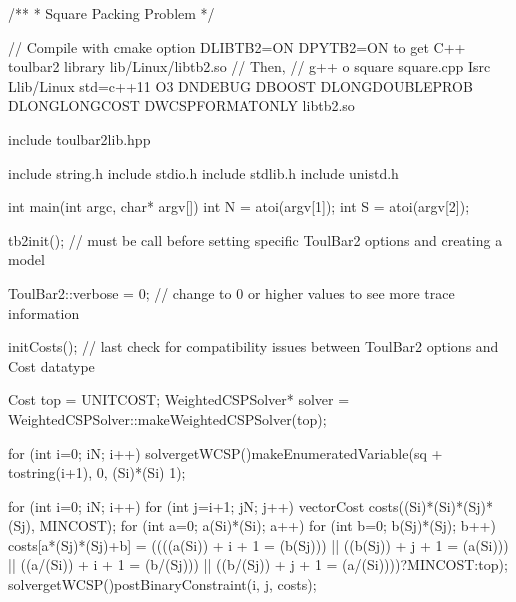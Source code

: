 \documentclass[letterpaper,10pt,openany,oneside,english]{sphinxmanual}
\begin{document}
\sphinxAtStartPar
{}

\begin{sphinxVerbatim}[commandchars=\\\{\}]

/**
 * Square Packing Problem
 */

// Compile with cmake option \PYGZhy{}DLIBTB2=ON \PYGZhy{}DPYTB2=ON to get C++ toulbar2 library lib/Linux/libtb2.so
// Then,
// g++ \PYGZhy{}o square square.cpp \PYGZhy{}Isrc \PYGZhy{}Llib/Linux \PYGZhy{}std=c++11 \PYGZhy{}O3 \PYGZhy{}DNDEBUG \PYGZhy{}DBOOST \PYGZhy{}DLONGDOUBLE\PYGZus{}PROB \PYGZhy{}DLONGLONG\PYGZus{}COST \PYGZhy{}DWCSPFORMATONLY libtb2.so

\PYGZsh{}include \PYGZdq{}toulbar2lib.hpp\PYGZdq{}

\PYGZsh{}include \PYGZlt{}string.h\PYGZgt{}
\PYGZsh{}include \PYGZlt{}stdio.h\PYGZgt{}
\PYGZsh{}include \PYGZlt{}stdlib.h\PYGZgt{}
\PYGZsh{}include \PYGZlt{}unistd.h\PYGZgt{}

int main(int argc, char* argv[])
\PYGZob{}
    int N = atoi(argv[1]);
    int S = atoi(argv[2]);

    tb2init(); // must be call before setting specific ToulBar2 options and creating a model

    ToulBar2::verbose = 0; // change to 0 or higher values to see more trace information

    initCosts(); // last check for compatibility issues between ToulBar2 options and Cost data\PYGZhy{}type

    Cost top = UNIT\PYGZus{}COST;
    WeightedCSPSolver* solver = WeightedCSPSolver::makeWeightedCSPSolver(top);

    for (int i=0; i\PYGZlt{}N; i++) \PYGZob{}
        solver\PYGZhy{}\PYGZgt{}getWCSP()\PYGZhy{}\PYGZgt{}makeEnumeratedVariable(\PYGZdq{}sq\PYGZdq{} + to\PYGZus{}string(i+1), 0, (S\PYGZhy{}i)*(S\PYGZhy{}i) \PYGZhy{} 1);
    \PYGZcb{}

    for (int i=0; i\PYGZlt{}N; i++) \PYGZob{}
        for (int j=i+1; j\PYGZlt{}N; j++) \PYGZob{}
            vector\PYGZlt{}Cost\PYGZgt{} costs((S\PYGZhy{}i)*(S\PYGZhy{}i)*(S\PYGZhy{}j)*(S\PYGZhy{}j), MIN\PYGZus{}COST);
    	    for (int a=0; a\PYGZlt{}(S\PYGZhy{}i)*(S\PYGZhy{}i); a++) \PYGZob{}
    	        for (int b=0; b\PYGZlt{}(S\PYGZhy{}j)*(S\PYGZhy{}j); b++) \PYGZob{}
                    costs[a*(S\PYGZhy{}j)*(S\PYGZhy{}j)+b] = ((((a\PYGZpc{}(S\PYGZhy{}i)) + i + 1 \PYGZlt{}= (b\PYGZpc{}(S\PYGZhy{}j))) || ((b\PYGZpc{}(S\PYGZhy{}j)) + j + 1 \PYGZlt{}= (a\PYGZpc{}(S\PYGZhy{}i))) || ((a/(S\PYGZhy{}i)) + i + 1 \PYGZlt{}= (b/(S\PYGZhy{}j))) || ((b/(S\PYGZhy{}j)) + j + 1 \PYGZlt{}= (a/(S\PYGZhy{}i))))?MIN\PYGZus{}COST:top);
                \PYGZcb{}
            \PYGZcb{}
            solver\PYGZhy{}\PYGZgt{}getWCSP()\PYGZhy{}\PYGZgt{}postBinaryConstraint(i, j, costs);
        \PYGZcb{}
    \PYGZcb{}


\end{sphinxVerbatim}
\end{document}
